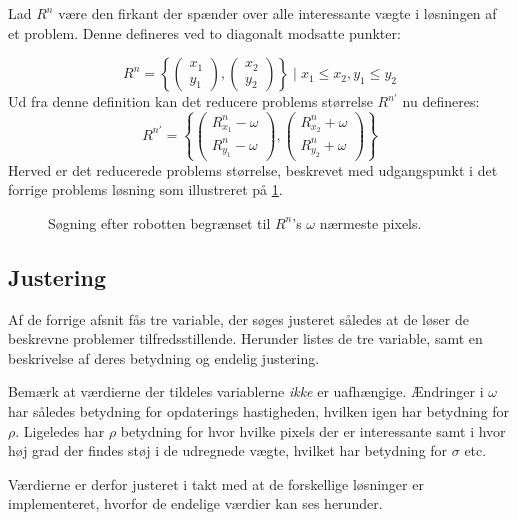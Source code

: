 Lad $R^n$ være den firkant der spænder over alle interessante vægte i løsningen af et problem.
Denne defineres ved to diagonalt modsatte punkter:
{
\newcommand{\cvec}[2]{\begin{pmatrix}#1\\#2\end{pmatrix}}

$$R^n = \left\{\cvec{x_1}{y_1}, \cvec{x_2}{y_2}\right\} \mid x_1 \leq x_2 , y_1 \leq y_2$$
Ud fra denne definition kan det reducere problems størrelse $R^{n'}$ nu defineres:
\begin{equation}\label{tracking:eq:inflate}
R^{n'} = \left\{
	\cvec{R^n_{x_1}-\omega}{R^n_{y_1}-\omega},
	\cvec{R^n_{x_2}+\omega}{R^n_{y_2}+\omega}
\right\}
\end{equation}
Herved er det reducerede problems størrelse, beskrevet med udgangspunkt i det forrige problems løsning som illustreret på \cref{tracking:reduction}.
}

\begin{figure}
\centering

\caption{Søgning efter robotten begrænset til $R^n$'s $\omega$ nærmeste pixels.}
\label{tracking:reduction}
\end{figure}

\subsection{Justering}\label{tracking:adjust}
Af de forrige afsnit fås tre variable, der søges justeret således at de løser de beskrevne problemer tilfredsstillende.
Herunder listes de tre variable, samt en beskrivelse af deres betydning og endelig justering.

Bemærk at værdierne der tildeles variablerne \emph{ikke} er uafhængige.
Ændringer i $\omega$ har således betydning for opdaterings hastigheden, hvilken igen har betydning for $\rho$.
Ligeledes har $\rho$ betydning for hvor hvilke pixels der er interessante samt i hvor høj grad der findes støj i de udregnede vægte, hvilket har betydning for $\sigma$ etc.

Værdierne er derfor justeret i takt med at de forskellige løsninger er implementeret, hvorfor de endelige værdier kan ses herunder.

